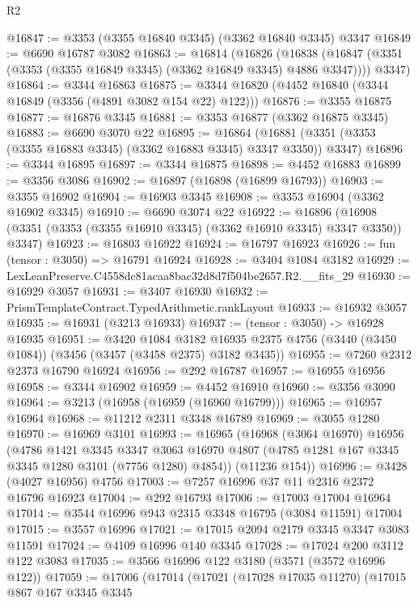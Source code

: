 \begin{lexlean}{R2}
\begin{coremodule}
@16847 := @3353 (@3355 @16840 @3345) (@3362 @16840 @3345) @3347
@16849 := @6690 @16787 @3082
@16863 := @16814
    (@16826
      (@16838 (@16847 (@3351 (@3353 (@3355 @16849 @3345) (@3362 @16849 @3345) @4886 @3347))))
      @3347)
@16864 := @3344 @16863
@16875 := @3344 @16820 (@4452 @16840 (@3344 @16849 (@3356 (@4891 @3082 @154 @22) @122)))
@16876 := @3355 @16875
@16877 := @16876 @3345
@16881 := @3353 @16877 (@3362 @16875 @3345)
@16883 := @6690 @3070 @22
@16895 := @16864
    (@16881 (@3351 (@3353 (@3355 @16883 @3345) (@3362 @16883 @3345) @3347 @3350)) @3347)
@16896 := @3344 @16895
@16897 := @3344 @16875
@16898 := @4452 @16883
@16899 := @3356 @3086
@16902 := @16897 (@16898 (@16899 @16793))
@16903 := @3355 @16902
@16904 := @16903 @3345
@16908 := @3353 @16904 (@3362 @16902 @3345)
@16910 := @6690 @3074 @22
@16922 := @16896
    (@16908 (@3351 (@3353 (@3355 @16910 @3345) (@3362 @16910 @3345) @3347 @3350)) @3347)
@16923 := @16803 @16922
@16924 := @16797 @16923
@16926 := fun (tensor : @3050) => @16791 @16924
@16928 := @3404 @1084 @3182
@16929 := LexLeanPreserve.C4558dc81acaa8bac32d8d7f504be2657.R2.__fits_29
@16930 := @16929 @3057
@16931 := @3407 @16930
@16932 := PrismTemplateContract.TypedArithmetic.rankLayout
@16933 := @16932 @3057
@16935 := @16931 (@3213 @16933)
@16937 := (tensor : @3050) -> @16928 @16935
@16951 := @3420
    @1084
    @3182
    @16935
    @2375
    @4756
    (@3440 (@3450 @1084))
    (@3456 (@3457 (@3458 @2375) @3182 @3435))
@16955 := @7260 @2312 @2373 @16790 @16924
@16956 := @292 @16787
@16957 := @16955 @16956
@16958 := @3344 @16902
@16959 := @4452 @16910
@16960 := @3356 @3090
@16964 := @3213 (@16958 (@16959 (@16960 @16799)))
@16965 := @16957 @16964
@16968 := @11212 @2311 @3348 @16789
@16969 := @3055 @1280
@16970 := @16969 @3101
@16993 := @16965
    (@16968
      (@3064 @16970)
      @16956
      (@4786
        @1421
        @3345
        @3347
        @3063
        @16970
        @4807
        (@4785 @1281 @167 @3345 @3345 @1280 @3101 (@7756 @1280) @4854))
      (@11236 @154))
@16996 := @3428 (@4027 @16956) @4756
@17003 := @7257 @16996 @37 @11 @2316 @2372 @16796 @16923
@17004 := @292 @16793
@17006 := @17003 @17004 @16964
@17014 := @3544 @16996 @943 @2315 @3348 @16795 (@3084 @11591) @17004
@17015 := @3557 @16996
@17021 := @17015 @2094 @2179 @3345 @3347 @3083 @11591
@17024 := @4109 @16996 @140 @3345
@17028 := @17024 @200 @3112 @122 @3083
@17035 := @3566 @16996 @122 @3180 (@3571 (@3572 @16996 @122))
@17059 := @17006
    (@17014
      (@17021
        (@17028 @17035 @11270)
        (@17015
          @867
          @167
          @3345
          @3345

\end{coremodule}
\end{lexlean}
